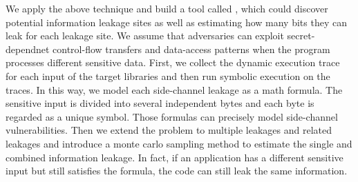 We apply the above technique and build a tool called \tool{},%
which could discover potential information leakage sites 
as well as estimating how many bits they can leak for each leakage site. 
We assume that adversaries can exploit secret-dependnet control-flow transfers and 
data-access patterns when the program processes different sensitive data. 
First, we collect the dynamic execution trace for each input of the target libraries 
and then run symbolic execution on the traces. 
In this way, we model each side-channel leakage as a math formula. 
The sensitive input is divided into several independent bytes and each byte is regarded as 
a unique symbol. Those formulas can precisely model side-channel vulnerabilities.
Then we extend the problem to multiple leakages and related leakages
and introduce a monte carlo sampling method to estimate the single and combined information leakage.
In fact, if an application has a different sensitive input but still satisfies the formula, 
the code can still leak the same information. 





